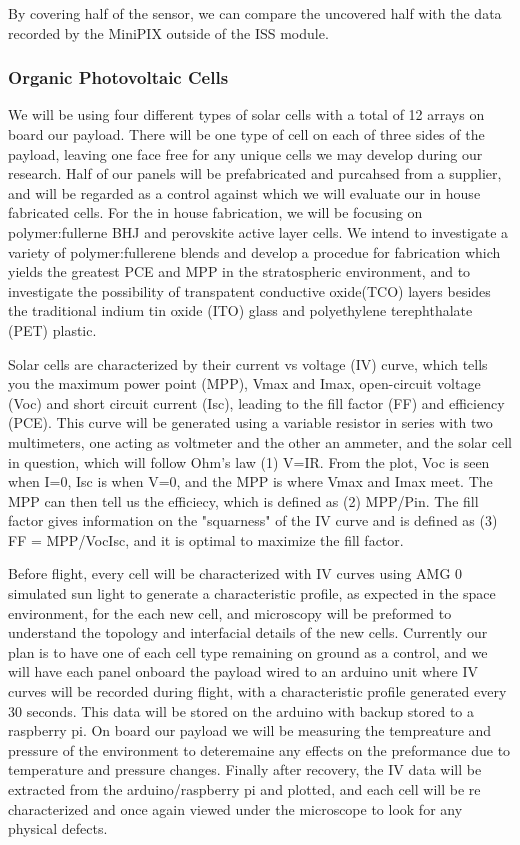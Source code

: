 {By covering half of the sensor, we can compare the uncovered half with the data recorded by the MiniPIX outside of the ISS module.

\subsubsection{Organic Photovoltaic Cells}    
We will be using four different types of solar cells with a total of 12 arrays on board our payload. There will be one type of cell on each of three sides of the payload, leaving one face free for any unique cells we may develop during our research. Half of our panels will be prefabricated and purcahsed from a supplier, and will be regarded as a control against which we will evaluate our in house fabricated cells. For the in house fabrication, we will be focusing on polymer:fullerne BHJ and perovskite active layer cells. We intend to investigate a variety of polymer:fullerene blends and develop a procedue for fabrication which yields the greatest PCE and MPP in the stratospheric environment, and to investigate the possibility of transpatent conductive oxide(TCO) layers besides the traditional indium tin oxide (ITO) glass and polyethylene terephthalate (PET) plastic. 

Solar cells are characterized by their current vs voltage (IV) curve, which tells you the maximum power point (MPP), Vmax and Imax, open-circuit voltage (Voc) and short circuit current (Isc), leading to the fill factor (FF) and efficiency (PCE). This curve will be  generated using a variable resistor in series with two multimeters, one acting as voltmeter and the other an ammeter, and the solar cell in question, which will follow Ohm's law (1) V=IR. From the plot, Voc is seen when I=0, Isc is when V=0, and the MPP is where Vmax and Imax meet. The MPP can then tell us the efficiecy, which is defined as (2) MPP/Pin. The fill factor gives information on the "squarness" of the IV curve and is defined as (3) FF = MPP/VocIsc, and it is optimal to maximize the fill factor. \cite{OPV operation}

    Before flight, every cell will be characterized with IV curves using AMG 0 simulated sun light to generate a characteristic profile, as expected in the space environment, for the each new cell, and microscopy will be preformed to understand the topology and interfacial details of the new cells. Currently our plan is to have one of each cell type remaining on ground as a control, and we will have each panel onboard the payload wired to an arduino unit where IV curves will be recorded during flight, with a characteristic profile generated every 30 seconds. This data will be stored on the arduino with backup stored to a raspberry pi. On  board our payload we will be measuring the tempreature and pressure of the environment to deteremaine any effects on the preformance due to temperature and pressure changes. Finally after recovery, the IV data will be extracted from the arduino/raspberry pi and plotted, and each cell will be re characterized and once again viewed under the microscope to look for any physical defects. 
    
}
